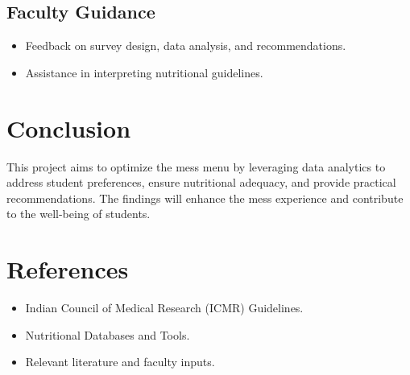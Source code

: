 \documentclass[12pt,a4paper]{article}
\begin{document}
\subsection{Faculty Guidance}
\begin{itemize}
    \item Feedback on survey design, data analysis, and recommendations.
    \item Assistance in interpreting nutritional guidelines.
\end{itemize}

\section{Conclusion}
This project aims to optimize the mess menu by leveraging data analytics to address student preferences, ensure nutritional adequacy, and provide practical recommendations. The findings will enhance the mess experience and contribute to the well-being of students.

\section{References}
\begin{itemize}
    \item Indian Council of Medical Research (ICMR) Guidelines.
    \item Nutritional Databases and Tools.
    \item Relevant literature and faculty inputs.
\end{itemize}
\end{document}
